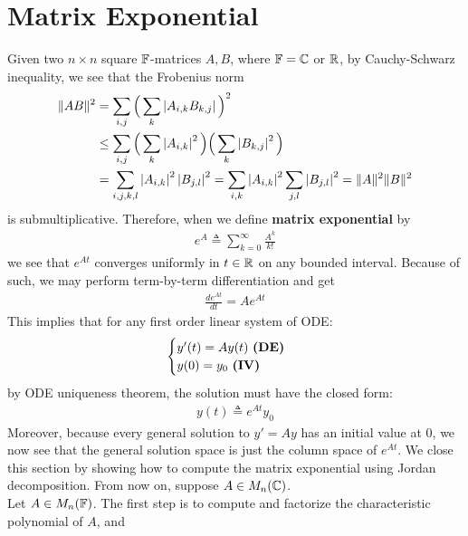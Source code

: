\documentclass{report}
\begin{document}
\section{Matrix Exponential}
Given two $n\times n$ square $\mathbb{F}$-matrices $A,B$, where $\mathbb{F}=\mathbb{C}$ or  $\mathbb{R}$, by Cauchy-Schwarz inequality, we see that the Frobenius norm
\begin{align*}
  \| AB \|^2 &= \sum_{i,j} \Big(\sum_k \left|A_{i,k}B_{k,j}\right| \Big)^2 \\
&\leq \sum_{i,j}  \Big(\sum_k \left|A_{i,k}\right|^2\Big) \Big( \sum_k \left|B_{k,j}\right|^2\Big) \\
&=\sum_{i,j,k,l} \left|A_{i,k}\right|^2 \left|B_{j,l}\right|^2 = \sum_{i,k} \left|A_{i,k}\right|^2 \sum_{j,l} \left|B_{j,l}\right|^2 = \| A \|^2 \| B \|^2
\end{align*}
is submultiplicative. Therefore, when we define   \textbf{matrix exponential} by 
\begin{align*}
e^A \triangleq \sum_{k=0}^{\infty} \frac{A^k}{k!}
\end{align*}
we see that $e^{At}$ converges uniformly in $t\in\mathbb{R}$ on any bounded interval. Because of such, we may perform term-by-term differentiation and get 
\begin{align*}
\frac{de^{At}}{dt}=Ae^{At}
\end{align*}
This implies that for any first order linear system of ODE: 
\begin{align*}
\begin{cases}
  y'(t)=Ay(t)\text{ \textbf{(DE)} } \\
  y(0)=y_0\text{ \textbf{(IV)} }
\end{cases}
\end{align*}
by ODE uniqueness theorem, the solution must have the closed form: 
\begin{align*}
y(t)\triangleq e^{At}y_0
\end{align*}
Moreover, because every general solution to $y'=Ay$ has an initial value at $0$, we now see that the general solution space is just the column space of $e^{At}$. We close this section by showing how to compute the matrix exponential using Jordan decomposition. From now on, suppose $A \in M_n(\mathbb{C})$. \\


Let $A \in M_n(\mathbb{F})$. The first step is to compute and factorize the characteristic polynomial of $A$, and   
\end{document}
